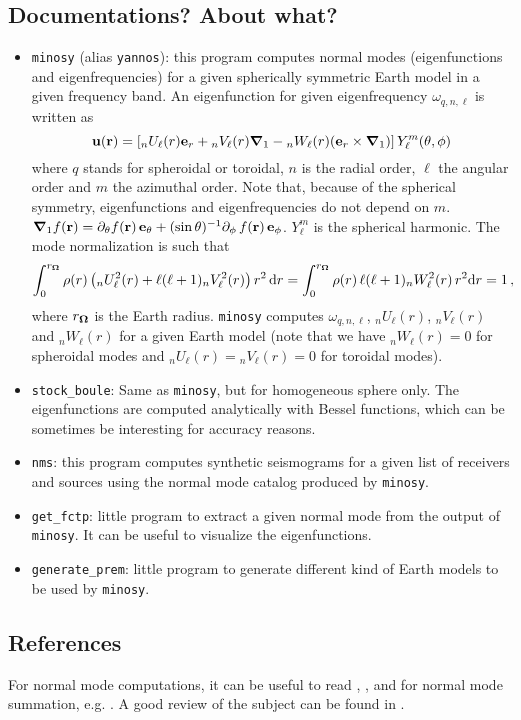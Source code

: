 \documentclass[11pt]{article}
\begin{document}
\subsection{Documentations? About what?}
\begin{itemize}	
\item {\tt minosy} (alias {\tt yannos}): this program computes
normal modes (eigenfunctions and eigenfrequencies) for a given 
spherically symmetric Earth model in a given frequency band.
An eigenfunction for given eigenfrequency $\omega_{q,n,\ell}$ is written as
$$\bold{u}(\bold{r})=\left[{_n}U_\ell(r) \bold{e}_r+{_n}V_\ell(r)
\boldsymbol{\nabla}_1-{_n}W_\ell(r)(\bold{e}_r\times\boldsymbol{\nabla}_1)
\right]Y_\ell^m(\theta,\phi)$$ where $q$ stands for spheroidal or
toroidal, $n$ is the radial order, $\ell$
the angular order and $m$ the azimuthal order. Note that, because of
the spherical symmetry, eigenfunctions and eigenfrequencies do not
depend on $m$. $\boldsymbol{\nabla}_1 f(\bold{r})
=\partial_\theta f(\bold{r})\,
\bold{e}_\theta+(\sin\theta)^{-1}\partial_\phi\,f(\bold{r})\,\bold{e}_\phi$.
$Y_\ell^m$   is the spherical harmonic. The mode normalization is such
that 
\begin{equation*}
\int _0^{r_{\boldsymbol{\Omega}}} \rho(r) \left( {_n}U_\ell^2(r) + \ell (\ell +1)
{_n}V_\ell^2(r)\right) r^2 \, 
\mathrm{d} r =
\int _0^{r_{\boldsymbol{\Omega}}} \rho(r)\,\ell (\ell +1)  {_n}W_\ell^2(r) \, r^2 \mathrm{d} r = 1\,,
\end{equation*}
where $r_{\boldsymbol{\Omega}}$ is the Earth radius. {\tt minosy} computes
$\omega_{q,n,\ell}$, ${_n}U_\ell(r)$, ${_n}V_\ell(r)$ and
${_n}W_\ell(r)$ for a given Earth model (note that we have
${_n}W_\ell(r)=0$ for spheroidal modes and
${_n}U_\ell(r)={_n}V_\ell(r)=0$ for toroidal modes).
\item {\tt stock\_boule}: Same as {\tt minosy}, but for homogeneous
sphere only. The eigenfunctions are computed analytically with Bessel
functions, which can be sometimes be interesting for accuracy reasons.  
\item {{\tt nms}}: this program computes synthetic seismograms for 
a given list of receivers and sources using the normal mode
catalog produced by {\tt minosy}.
\item {\tt get\_fctp}: little program to extract a given normal mode
from the output of {\tt minosy}. It can be useful to visualize 
the eigenfunctions.
\item {\tt generate\_prem}:  little program to generate different 
kind of Earth models to be used by {\tt minosy}.
\end{itemize}	
\subsection{References}
For normal mode computations, it can be useful to read 
, ,
 and for normal mode summation,
e.g. . A good review of the 
subject can be found in .
\vspace{-1cm}

\def\refname{}

\end{document}
